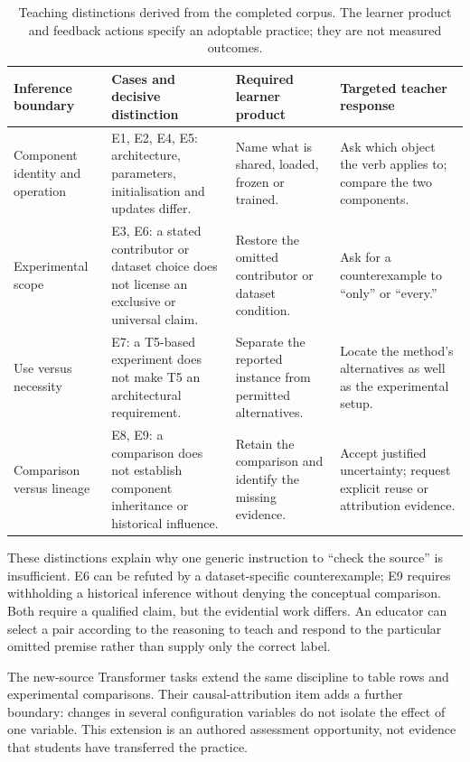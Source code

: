 \begin{table}[t]
\caption{Teaching distinctions derived from the completed corpus. The learner product and feedback actions specify an adoptable practice; they are not measured outcomes.}
\label{tab:inference}
\begin{tabular}{@{}p{}p{}p{}p{}@{}}
\toprule
Inference boundary & Cases and decisive distinction & Required learner product & Targeted teacher response\\
\midrule
Component identity and operation & E1, E2, E4, E5: architecture, parameters, initialisation and updates differ. & Name what is shared, loaded, frozen or trained. & Ask which object the verb applies to; compare the two components.\\
Experimental scope & E3, E6: a stated contributor or dataset choice does not license an exclusive or universal claim. & Restore the omitted contributor or dataset condition. & Ask for a counterexample to ``only'' or ``every.''\\
Use versus necessity & E7: a T5-based experiment does not make T5 an architectural requirement. & Separate the reported instance from permitted alternatives. & Locate the method's alternatives as well as the experimental setup.\\
Comparison versus lineage & E8, E9: a comparison does not establish component inheritance or historical influence. & Retain the comparison and identify the missing evidence. & Accept justified uncertainty; request explicit reuse or attribution evidence.\\
\bottomrule
\end{tabular}
\end{table}

These distinctions explain why one generic instruction to ``check the source'' is insufficient. E6 can be refuted by a dataset-specific counterexample; E9 requires withholding a historical inference without denying the conceptual comparison. Both require a qualified claim, but the evidential work differs. An educator can select a pair according to the reasoning to teach and respond to the particular omitted premise rather than supply only the correct label.

The new-source Transformer tasks extend the same discipline to table rows and experimental comparisons. Their causal-attribution item adds a further boundary: changes in several configuration variables do not isolate the effect of one variable. This extension is an authored assessment opportunity, not evidence that students have transferred the practice.

